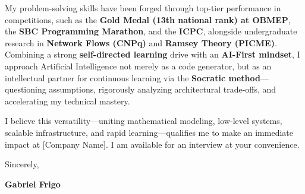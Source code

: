 \documentclass[letterpaper,10pt]{article}
\newcommand{\candidateName}{Gabriel Frigo}
\newcommand{\targetCompany}{[Company Name]}
\begin{document}
My problem-solving skills have been forged through top-tier performance in competitions, such as the \textbf{Gold Medal (13th national rank) at OBMEP}, the \textbf{SBC Programming Marathon}, and the \textbf{ICPC}, alongside undergraduate research in \textbf{Network Flows (CNPq)} and \textbf{Ramsey Theory (PICME)}. Combining a strong \textbf{self-directed learning} drive with an \textbf{AI-First mindset}, I approach Artificial Intelligence not merely as a code generator, but as an intellectual partner for continuous learning via the \textbf{Socratic method}---questioning assumptions, rigorously analyzing architectural trade-offs, and accelerating my technical mastery.

I believe this versatility---uniting mathematical modeling, low-level systems, scalable infrastructure, and rapid learning---qualifies me to make an immediate impact at \targetCompany. I am available for an interview at your convenience.

Sincerely,

\textbf{\candidateName}
\end{document}
